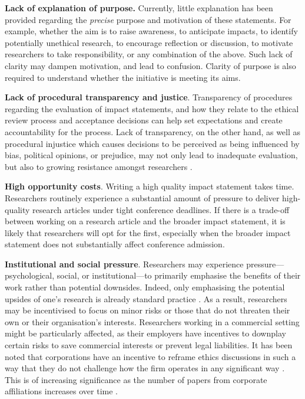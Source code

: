 \documentclass[11pt,english]{article}
\begin{document}
	\textbf{Lack of explanation of purpose.} Currently, little explanation has been provided regarding the \textit{precise} purpose and motivation of these statements. For example, whether the aim is to raise awareness, to anticipate impacts, to identify potentially unethical research, to encourage reflection or discussion, to motivate researchers to take responsibility, or any combination of the above. Such lack of clarity may dampen motivation, and lead to confusion. Clarity of purpose is also required to understand whether the initiative is meeting its aims.
	
	
	\textbf{Lack of procedural transparency and justice}. Transparency of procedures regarding the evaluation of impact statements, and how they relate to the ethical review process and acceptance decisions can help set expectations and create accountability for the process. Lack of transparency, on the other hand, as well as procedural injustice which causes decisions to be perceived as being influenced by bias, political opinions, or prejudice, may not only lead to inadequate evaluation, but also to growing resistance amongst researchers \citep{keith-spiegel_what_2006}.
	
	\textbf{High opportunity costs}. Writing a high quality impact statement takes time. Researchers routinely experience a substantial amount of pressure to deliver high-quality research articles under tight conference deadlines. If there is a trade-off between working on a research article and the broader impact statement, it is likely that researchers will opt for the first, especially when the broader impact statement does not substantially affect conference admission.
	
	\textbf{Institutional and social pressure}. Researchers may experience pressure---psychological, social, or institutional---to primarily emphasise the benefits of their work rather than potential downsides. Indeed, only emphasising the potential upsides of one's research is already standard practice \citep{hecht_its_2018}. As a result, researchers may be incentivised to focus on minor risks or those that do not threaten their own or their organisation's interests. Researchers working in a commercial setting might be particularly affected, as their employers have incentives to downplay certain risks to save commercial interests or prevent legal liabilities. It has been noted that corporations have an incentive to reframe ethics discussions in such a way that they do not challenge how the firm operates in any significant way \citep{bietti_ethics_2020}. This is of increasing significance as the number of papers from corporate affiliations increases over time \citep{hagendorff_big_2020}. 
	
\end{document}

